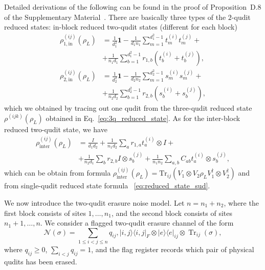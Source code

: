 \documentclass[10pt,twocolumn,superscriptaddress,aps,amsmath,amssymb,citeautoscript,floatfix,prx,longbibliography]{revtex4-2}
\theoremstyle{plain}
\theoremstyle{plain}
\theoremstyle{plain}
\theoremstyle{plain}
\theoremstyle{plain}
\theoremstyle{plain}
\begin{document}
Detailed derivations of the following can be found in the proof of Proposition~D.8 of the Supplementary Material~\cite{SuppMat}. There are basically three types of the $2$-qudit reduced states: in-block reduced two-qudit states (different for each block)
\[
\begin{aligned}
    \rho_{1,\text {in }}^{(ij)}(\rho_L)&=\frac{1}{d_1^2} \mathbf{1}-\frac{1}{d_1 n_1} \sum_{m=1}^{d_1^2-1} t_m^{(i)} t_m^{(j)}+\\&+\frac{1}{n_1 d_1} \sum_{b=1}^{d_1^2-1} r_{1,b}\left(t_b^{(i)}+t_b^{(j)}\right),\\
    \rho_{2,\text {in }}^{(ij)}(\rho_L)&=\frac{1}{d_2^2} \mathbf{1}-\frac{1}{d_2 n_2} \sum_{m=1}^{d_2^2-1} s_m^{(i)} s_m^{(j)}+\\&+\frac{1}{n_2 d_2} \sum_{b=1}^{d_2^2-1} r_{2,b}\left(s_b^{(i)}+s_b^{(j)}\right),
\end{aligned}
\]
which we obtained by tracing out one qudit from the three-qudit reduced state $\rho^{(i j k)}(\rho_L)$ obtained in Eq.~\eqref{eq:3q_reduced_state}. As for the inter-block reduced two-qudit state, we have
\[
\begin{aligned}
    \rho_{\text{inter}}^{(ij)}(\rho_L)&=\frac{I}{d_1 d_2}+\frac{1}{n_1 d_2} \sum_a r_{1,a} t_a^{(i)} \otimes I+\\&+\frac{1}{n_2 d_1} \sum_b r_{2,b} I \otimes s_b^{(j)}+\frac{1}{n_1 n_2} \sum_{a, b} C_{a b} t_a^{(i)} \otimes s_b^{(j)},    
\end{aligned}
\]
which can be obtain from formula $\rho_{\text{inter}}^{(ij)}(\rho_L)=\mathrm{Tr}_{ij}\left(V_1\otimes V_2\rho_L V_1^{\dagger}\otimes V_2^{\dagger}\right)$ and from single-qudit reduced state formula ~\eqref{eq:reduced_state_sud}.

We now introduce the two-qudit erasure noise model. Let \(n=n_1+n_2\), where the first block consists of sites \(1,\ldots,n_1\), and the second block consists of sites \(n_1+1,\ldots,n\). We consider a flagged two-qudit erasure channel of the form
\[
\mathcal N(\sigma)
=
\sum_{1\leq i<j\leq n}
q_{ij},
|i,j\rangle\langle i,j|_F
\otimes
|e\rangle\langle e|_{ij}
\otimes
\operatorname{Tr}_{ij}(\sigma),
\]
where \(q_{ij}\geq 0\), \(\sum_{i<j}q_{ij}=1\), and the flag register records which pair of physical qudits has been erased.
\end{document}
